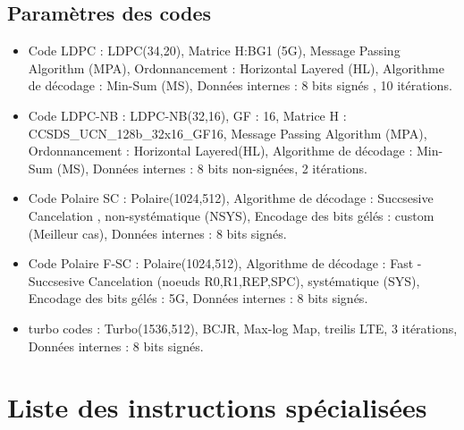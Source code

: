\documentclass[../main.tex]{subfiles}
\begin{document}
  \subsection{Paramètres des codes}

  \begin{itemize}
    \item Code LDPC         : LDPC(34,20), Matrice H:BG1 (5G), Message Passing Algorithm (MPA), Ordonnancement : Horizontal Layered (HL), Algorithme de décodage : Min-Sum (MS), Données internes : 8 bits signés , 10 itérations. 
    \\
    \item Code LDPC-NB      : LDPC-NB(32,16), GF : 16, Matrice H : CCSDS\_UCN\_128b\_32x16\_GF16, Message Passing Algorithm (MPA), Ordonnancement : Horizontal Layered(HL), Algorithme de décodage : Min-Sum (MS), Données internes : 8 bits non-signées, 2 itérations.
    \\ 
    \item Code Polaire SC   : Polaire(1024,512), Algorithme de décodage : Succsesive Cancelation , non-systématique (NSYS), Encodage des bits gélés : custom (Meilleur cas), Données internes : 8 bits signés.
    \\ 
    \item Code Polaire F-SC : Polaire(1024,512), Algorithme de décodage : Fast - Succsesive Cancelation (noeuds R0,R1,REP,SPC), systématique (SYS), Encodage des bits gélés : 5G, Données internes : 8 bits signés. 
    \\ 
    \item turbo codes       : Turbo(1536,512), BCJR, Max-log Map, treilis LTE, 3 itérations, Données internes : 8 bits signés. 
  \end{itemize}


\section*{Liste des instructions spécialisées} 

\end{document}
